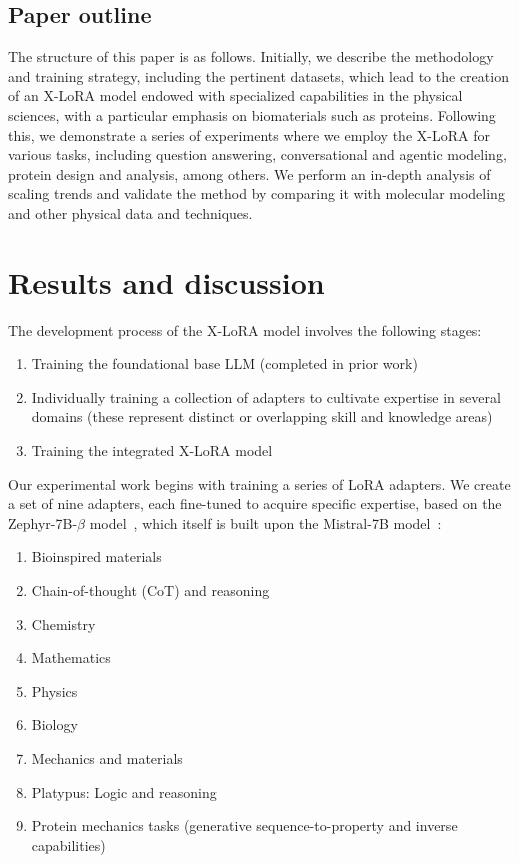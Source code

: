 \subsection{Paper outline}

The structure of this paper is as follows. Initially, we describe the methodology and training strategy, including the pertinent datasets, which lead to the creation of an X-LoRA model endowed with specialized capabilities in the physical sciences, with a particular emphasis on biomaterials such as proteins. Following this, we demonstrate a series of experiments where we employ the X-LoRA for various tasks, including question answering, conversational and agentic modeling, protein design and analysis, among others. We perform an in-depth analysis of scaling trends and validate the method by comparing it with molecular modeling and other physical data and techniques.

\section{Results and discussion}

The development process of the X-LoRA model involves the following stages:

\begin{enumerate}
    \item Training the foundational base LLM (completed in prior work) \item Individually training a collection of adapters to cultivate expertise in several domains (these represent distinct or overlapping skill and knowledge areas) \item Training the integrated X-LoRA model
\end{enumerate}

Our experimental work begins with training a series of LoRA adapters. We create a set of nine adapters, each fine-tuned to acquire specific expertise, based on the Zephyr-7B-$\beta$ model~\cite{HuggingFaceH4/zephyr-7b-betaFace}, which itself is built upon the Mistral-7B model~\cite{Jiang2023Mistral7B}:

\begin{enumerate}
    \item Bioinspired materials \item Chain-of-thought (CoT) and reasoning \item Chemistry \item Mathematics \item Physics \item Biology \item Mechanics and materials \item Platypus: Logic and reasoning \item Protein mechanics tasks (generative sequence-to-property and inverse capabilities)
\end{enumerate}

